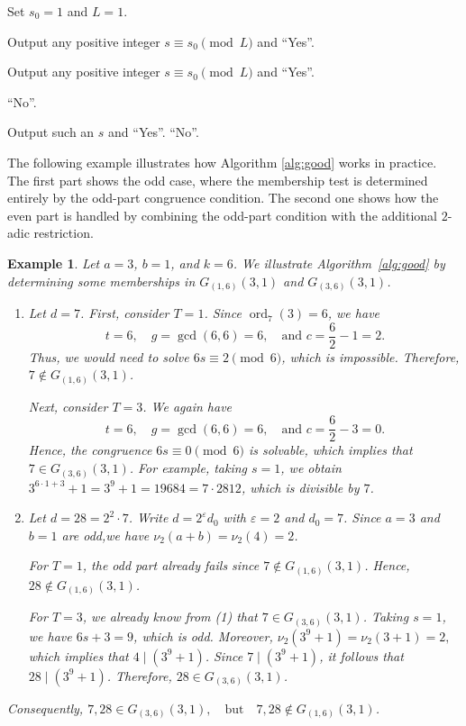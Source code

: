 \documentclass[pdflatex,sn-mathphys-num]{sn-jnl}%
\theoremstyle{thmstyleone}%
\theoremstyle{thmstyletwo}%
\newtheorem{example}{Example}%
\theoremstyle{thmstylethree}%
\newcommand{\ord}{\operatorname{ord}}
\begin{document}
\begin{algorithm}[!hbt]
\begin{algorithmic}[1]
\Else
  \State Set $
  s_0=1 $ and $
  L=1$.
\EndIf

  \State Output any positive integer $s\equiv s_0\pmod L$ and \Return ``Yes''.
\EndIf

    \State Output any positive integer $s\equiv s_0\pmod L$ and \Return ``Yes''.
  \EndIf

    \State \Return ``No''.
  \EndIf

    \State Output such an $s$ and \Return ``Yes''.
  \Else
    \State \Return ``No''.
  \EndIf
\EndIf
\end{algorithmic}
\end{algorithm}


 

The following example illustrates how  Algorithm  \ref{alg:good} works in practice. The first part shows the odd case, where the membership test is determined entirely by the odd-part congruence condition. The second one shows how the even part is handled by combining the odd-part condition with the additional $2$-adic restriction.

\begin{example}
Let $a=3$, $b=1$, and $k=6$. We illustrate Algorithm~\ref{alg:good} by determining some memberships in $G_{(1,6)}(3,1)$ and $G_{(3,6)}(3,1)$.

\begin{enumerate}[$(1)$]
\item Let $d=7$.  First, consider   $T=1$. Since
$
\ord_7(3)=6$,
we have
\[
t=6,\quad g=\gcd(6,6)=6, \quad \text{and } c=\frac{6}{2}-1=2.
\]
Thus,  we would need to solve
$
6s\equiv 2 \pmod 6$,
which is impossible. Therefore, 
$
7\notin G_{(1,6)}(3,1)$.

Next, consider   $T=3$. We again have
\[
t=6,\quad g=\gcd(6,6)=6,\quad  \text{and } c=\frac{6}{2}-3=0.
\]
Hence, the congruence
$
6s\equiv 0 \pmod 6$ 
is solvable,  which implies that $
7\in G_{(3,6)}(3,1)$.
For example, taking $s=1$, we obtain
$
3^{6\cdot 1+3}+1=3^9+1=19684=7\cdot 2812$,
which is divisible by $7$.

\item Let $d=28=2^2\cdot 7$.
Write $
d=2^\varepsilon d_0$
with $
\varepsilon=2$ and $d_0=7$.
Since $a=3$ and $b=1$ are odd,we have $
\nu_2(a+b)=\nu_2(4)=2$.

For $T=1$, the odd part already fails since
$
7\notin G_{(1,6)}(3,1)$.
Hence, $
28\notin G_{(1,6)}(3,1)$.

For $T=3$, we already know from \textup{(1)} that $
7\in G_{(3,6)}(3,1)$.
Taking $s=1$, we have
$
6s+3=9$,
which is odd. Moreover,
$
\nu_2(3^9+1)=\nu_2(3+1)=2,
$
which implies that 
$
4\mid (3^9+1)$.
Since 
$
7\mid (3^9+1)$,
it follows that
$
28\mid (3^9+1)$. 
Therefore, $
28\in G_{(3,6)}(3,1)$.
\end{enumerate}
Consequently,
$
7,28\in G_{(3,6)}(3,1),
\quad\text{but}\quad
7,28\notin G_{(1,6)}(3,1)$.
\end{example}
\end{document}
